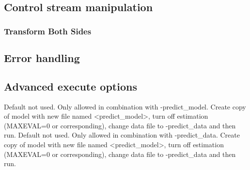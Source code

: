 \subsection{Control stream manipulation}

\subsubsection{Transform Both Sides}


\subsection{Error handling}



\subsection{Advanced execute options}
\begin{optionlist}
Default not used. 
Only allowed in combination with -predict\_model.
Create copy of model with new file named <predict\_model>, turn off estimation 
(MAXEVAL=0 or corresponding), change data file to -predict\_data and then run.
Default not used. 
Only allowed in combination with -predict\_data.
Create copy of model with new file named <predict\_model>, turn off estimation 
(MAXEVAL=0 or corresponding), change data file to -predict\_data and then run.
\nextopt
\end{optionlist}



